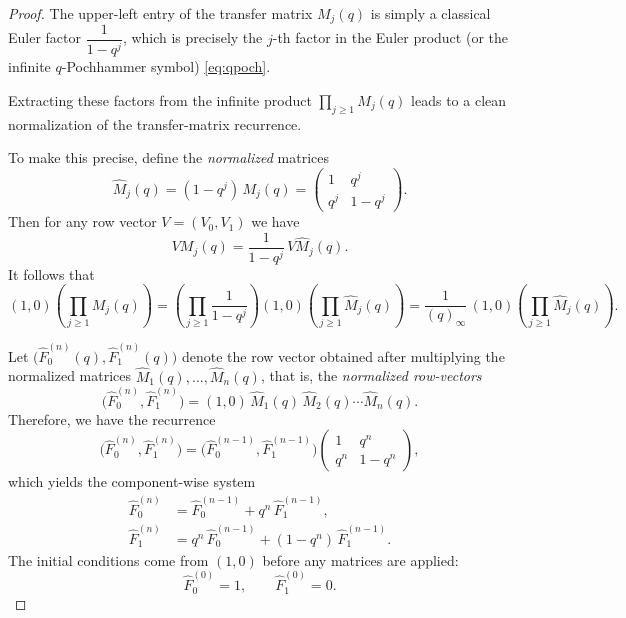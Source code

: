 \documentclass[letterpaper,12pt]{article}
\begin{document}
\begin{proof}


 

The upper-left entry of the transfer matrix $M_j(q)$ is simply a   classical Euler factor $\dfrac{1}{1-q^j}$, which is precisely the \(j\)-th factor in the Euler product (or the infinite $q$-Pochhammer symbol) \eqref{eq:qpoch}.


Extracting these factors from the infinite product
\(\prod_{j\ge1} M_j(q)\) leads to a clean normalization of the transfer-matrix
recurrence.



 
To make this precise, define the \emph{normalized} matrices
\begin{equation}\label{eq:NormlizedMatrix}
    \widehat{M}_j(q)
 = 
(1-q^j)\, M_j(q)
=
\begin{pmatrix}
1 & q^j \\[4pt]
q^j & 1-q^j
\end{pmatrix}.
\end{equation}
Then for any row vector \(V=(V_0,V_1)\) we have
\[
V M_j(q)
=
\frac{1}{1-q^j}\, V \widehat{M}_j(q).
\]
It follows that
\[
(1,0)\!\left(\prod_{j\ge1} M_j(q)\right)
=
\left(\prod_{j\ge1} \frac{1}{1-q^j}\right)
(1,0)\!\left(\prod_{j\ge1} \widehat{M}_j(q)\right)
=
\frac{1}{(q)_\infty}\,
(1,0)\!\left(\prod_{j\ge1} \widehat{M}_j(q)\right).
\]



 
Let \(\bigl(\widehat{F}_0^{(n)}(q),\widehat{F}_1^{(n)}(q)\bigr)\) denote the row vector
obtained after multiplying the normalized matrices \(\widehat{M}_1(q),\ldots,\widehat{M}_n(q)\), that is, the \emph{normalized row-vectors} 
\begin{equation}\label{eq:NormlizedVector}
    \bigl(\widehat{F}_0^{(n)},\widehat{F}_1^{(n)}\bigr)
=
(1,0) \,\widehat{M}_1(q)\,\widehat{M}_2(q)\cdots\widehat{M}_n(q).
\end{equation}
Therefore, we have the recurrence
\begin{equation}
    \bigl(\widehat{F}_0^{(n)},\widehat{F}_1^{(n)}\bigr)
=
\bigl(\widehat{F}_0^{(n-1)},\widehat{F}_1^{(n-1)}\bigr)
\begin{pmatrix}
1 & q^n \\[4pt]
q^n & 1-q^n
\end{pmatrix},
\end{equation}
which yields the component-wise system
\begin{align*}
\widehat{F}_0^{(n)}
&=
\widehat{F}_0^{(n-1)} + q^n\,\widehat{F}_1^{(n-1)},\\[4pt]
\widehat{F}_1^{(n)}
&=
q^n\,\widehat{F}_0^{(n-1)} + (1-q^n)\,\widehat{F}_1^{(n-1)}.
\end{align*}
The initial conditions come from \((1,0)\) before any matrices are applied:
\[
\widehat{F}_0^{(0)} = 1,\qquad
\widehat{F}_1^{(0)} = 0.
\]




\end{proof}
\end{document}
